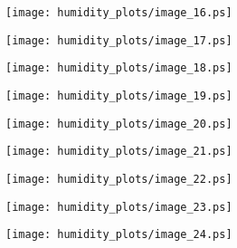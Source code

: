 \documentclass[11pt]{amsart}
\theoremstyle{plain}%
\theoremstyle{definition}
\theoremstyle{remark}
\numberwithin{equation}{thm}
\begin{document}
\begin{figure}[H]
\begin{center}
\texttt{[image: humidity\_plots/image\_16.ps]} 
\end{center}
\end{figure}

\begin{figure}[H]
\begin{center}
\texttt{[image: humidity\_plots/image\_17.ps]} 
\end{center}
\end{figure}

\begin{figure}[H]
\begin{center}
\texttt{[image: humidity\_plots/image\_18.ps]} 
\end{center}
\end{figure}

\begin{figure}[H]
\begin{center}
\texttt{[image: humidity\_plots/image\_19.ps]} 
\end{center}
\end{figure}

\begin{figure}[H]
\begin{center}
\texttt{[image: humidity\_plots/image\_20.ps]} 
\end{center}
\end{figure}

\begin{figure}[H]
\begin{center}
\texttt{[image: humidity\_plots/image\_21.ps]} 
\end{center}
\end{figure}

\begin{figure}[H]
\begin{center}
\texttt{[image: humidity\_plots/image\_22.ps]} 
\end{center}
\end{figure}

\begin{figure}[H]
\begin{center}
\texttt{[image: humidity\_plots/image\_23.ps]} 
\end{center}
\end{figure}

\begin{figure}[H]
\begin{center}
\texttt{[image: humidity\_plots/image\_24.ps]} 
\end{center}
\end{figure}
\end{document}
